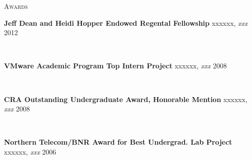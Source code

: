 \documentclass[10pt,times]{report}
\newlength{\sectiongap}
\newlength{\entrygap}
\newlength{\sectioncolwidth}
\newlength{\colgap}
\newlength{\stuffwidth}
\def\ifEqString#1#2{\def\testa{#1}\def\testb{#2}%
  \ifx\testa\testb}
\newenvironment{rtable}{
  \begin{minipage}{\textwidth}
  }{
  \end{minipage}
}
\newenvironment{rentry}[3][xxx]{
  \begin{minipage}[t]{\hsize}
    \textbf{#2}\ifEqString{#1}{xxx}\relax\else, \textit{#1}\fi
    \hspace{\stretch{1}} #3 \\
  }{
    \removelastskip
  \end{minipage}
  \\[\entrygap]  %
}
\newenvironment{rsection}[1]{
  \begin{minipage}[t]{\sectioncolwidth}
    \textsc{#1}
  \end{minipage}
  \hspace{\colgap}
  \begin{minipage}[t]{\stuffwidth}
  }{
    \removelastskip
  \end{minipage}
  \\[\sectiongap]
}
\begin{document}
\begin{rtable}
\begin{rsection}{Awards}
\begin{rentry}{Jeff Dean and Heidi Hopper Endowed Regental Fellowship}{2012}
       \vspace{-0.5em}
    \end{rentry}
    \begin{rentry}{VMware Academic Program Top Intern Project}{2008}
       \vspace{-0.5em}
    \end{rentry}
    \begin{rentry}{CRA Outstanding Undergraduate Award, Honorable
      Mention}{2008}
    \vspace{-0.5em}
    \end{rentry}
    \begin{rentry}{Northern Telecom/BNR Award for Best Undergrad. Lab
        Project}{2006}
      \vspace{-0.5em}
    \end{rentry}
  \end{rsection}


\end{rtable}
\end{document}
